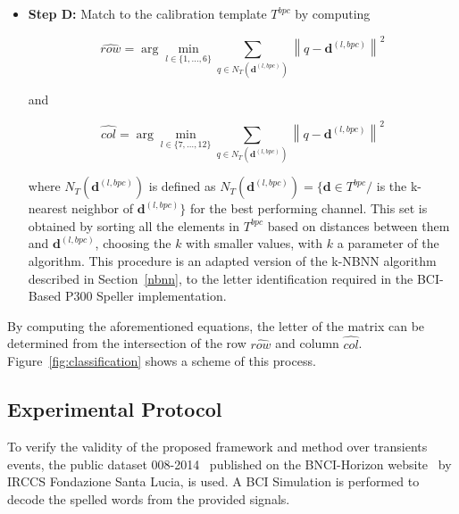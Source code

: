 \begin{itemize}

\item \textbf{Step D:} Match to the calibration template $T^{bpc}$ by computing  

\begin{equation}
\hat{row} = \arg \min_{l \in \{1,\dots,6\}} \sum_{q \in N_T(\mathbf{d}^{(l,bpc)})}^{} {\left\lVert q -  \mathbf{d}^{(l,bpc)} \right\rVert}  ^{2}
\label{eq:multiclassificationrow}
\end{equation}

\noindent and

\begin{equation}
\hat{col} = \arg \min_{l \in \{7,\dots,12\}} \sum_{q \in N_T(\mathbf{d}^{(l,bpc)})}^{} {\left\lVert q -  \mathbf{d}^{(l,bpc)} \right\rVert} ^{2}
\label{eq:multiclassificationcol}
\end{equation}

\noindent where $N_T(\mathbf{d}^{(l,bpc)})$  is defined as $N_T(\mathbf{d}^{(l,bpc)}) = \{\mathbf{d} \in T^{bpc} / $  is the k-nearest neighbor of $ \mathbf{d}^{(l,bpc)} \}$ for the best performing channel.  This set is obtained by sorting all the elements in $T^{bpc}$ based on distances between them and $\mathbf{d}^{(l,bpc)}$, choosing the $k$ with smaller values, with $k$ a parameter of the algorithm.  This procedure is an adapted version of the k-NBNN  algorithm~\cite{Boiman2008} described in Section~\ref{nbnn}, to the letter identification required in the BCI-Based P300 Speller implementation.

\end{itemize}
By computing the aforementioned equations, the letter of the matrix can be determined from the intersection of the row $ \hat{row} $ and column $ \hat{col} $. 
Figure~\ref{fig:classification} shows a scheme of this process. 


\subsection{Experimental Protocol} \label{Protocol}


To verify the validity of the proposed framework and method over transients events, the public dataset 008-2014~\cite{Riccio2013} published on the BNCI-Horizon website~\cite{Brunner2014} by  IRCCS Fondazione Santa Lucia, is used. A BCI Simulation is performed to decode the spelled words from the provided signals.

